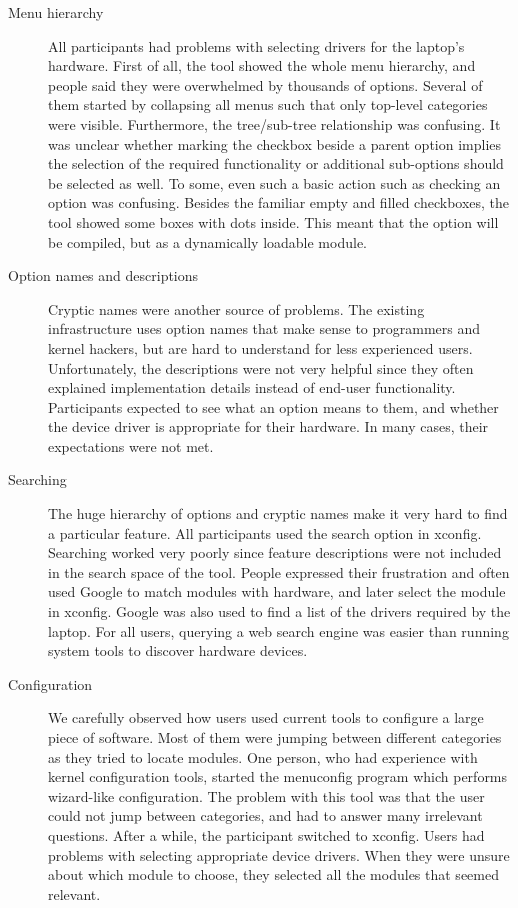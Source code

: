 \documentclass{chi2009}
\begin{document}
\begin{description}
  \item[Menu hierarchy]
All participants had problems with selecting drivers for the laptop's hardware. First of all, the tool showed the whole menu hierarchy, and people said they
were overwhelmed by thousands of options. Several of them started by collapsing all menus such that only top-level categories were visible. Furthermore, the
tree/sub-tree relationship was confusing. It was unclear whether marking the checkbox beside a parent option implies the selection of the required
functionality or additional sub-options should be selected as well. To some, even such a basic action such as checking an option was confusing. Besides the
familiar empty and filled checkboxes, the tool showed some boxes with dots inside. This meant that the option will be compiled, but as a dynamically loadable
module.

  \item[Option names and descriptions]
Cryptic names were another source of problems. The existing infrastructure uses option names that make sense to programmers and kernel hackers, but are hard to
understand for less experienced users. Unfortunately, the descriptions were not very helpful since they often explained implementation details instead of
end-user functionality. Participants expected to see what an option means to them, and whether the device driver is appropriate for their hardware. In many
cases, their expectations were not met.

  \item[Searching]
The huge hierarchy of options and cryptic names make it very hard to find a particular feature. All participants used the search option in \textsf{xconfig}.
Searching worked very poorly since feature descriptions were not included in the search space of the tool. People expressed their frustration and often used
Google to match modules with hardware, and later select the module in \textsf{xconfig}. Google was also used to find a list of the drivers required by the
laptop. For all users, querying a web search engine was easier than running system tools to discover hardware devices.

  \item[Configuration]
We carefully observed how users used current tools to configure a large piece of software. Most of them were jumping between different categories as they tried
to locate modules. One person, who had experience with kernel configuration tools, started the \textsf{menuconfig} program which performs wizard-like
configuration. The problem with this tool was that the user could not jump between categories, and had to answer many irrelevant questions. After a while, the
participant switched to \textsf{xconfig}. Users had problems with selecting appropriate device drivers. When they were unsure about which module to choose, they
selected all the modules that seemed relevant. 
\end{description}
\end{document}
